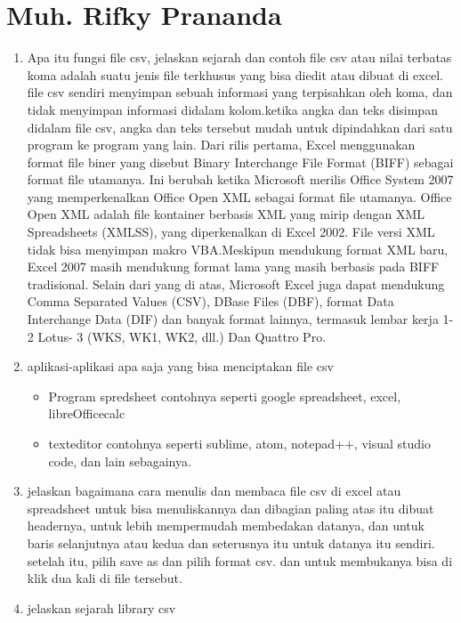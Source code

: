 \section{Muh. Rifky Prananda}
\begin{enumerate}
       \item Apa itu fungsi file csv, jelaskan sejarah dan contoh
       file csv atau nilai terbatas koma adalah suatu jenis file terkhusus yang bisa diedit atau dibuat di excel. file csv sendiri menyimpan sebuah informasi yang terpisahkan oleh koma, dan tidak menyimpan informasi didalam kolom.ketika angka dan teks disimpan didalam file csv, angka dan teks tersebut mudah untuk dipindahkan dari satu program ke program yang lain.
Dari rilis pertama, Excel menggunakan format file biner yang disebut Binary Interchange File Format (BIFF) sebagai format file utamanya. Ini berubah ketika Microsoft merilis Office System 2007 yang memperkenalkan Office Open XML sebagai format file utamanya. Office Open XML adalah file kontainer berbasis XML yang mirip dengan XML Spreadsheets (XMLSS), yang diperkenalkan di Excel 2002. File versi XML tidak bisa menyimpan makro VBA.Meskipun mendukung format XML baru, Excel 2007 masih mendukung format lama yang masih berbasis pada BIFF tradisional. Selain dari yang di atas, Microsoft Excel juga dapat mendukung Comma Separated Values (CSV), DBase Files (DBF), format Data Interchange Data (DIF) dan banyak format lainnya, termasuk lembar kerja 1-2 Lotus- 3 (WKS, WK1, WK2, dll.) Dan Quattro Pro.
        \item aplikasi-aplikasi apa saja yang bisa menciptakan file csv 
        \begin{itemize}
               \item Program spredsheet
               contohnya seperti google spreadsheet, excel, libreOfficecalc
               \item texteditor
               contohnya seperti sublime, atom, notepad++, visual studio code, dan lain sebagainya.
        \end{itemize}
        \item jelaskan bagaimana cara menulis dan membaca file csv di excel atau spreadsheet 
        untuk bisa menuliskannya dan dibagian paling atas itu dibuat headernya, untuk lebih mempermudah membedakan datanya, dan untuk baris selanjutnya atau kedua dan seterusnya itu untuk datanya itu sendiri. setelah itu, pilih save as dan pilih format csv. dan untuk membukanya bisa di klik dua kali di file tersebut.
        \item jelaskan sejarah library csv

\end{enumerate}
